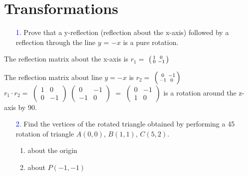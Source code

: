 \documentclass[11pt]{article}  %
\begin{document}
\section{Transformations}
    \begin{enumerate}[leftmargin=*]
        \item[\textcolor{blue}{1.}] Prove that a y-reflection (reflection about the x-axis) followed by a reflection through the line $y$ = $-x$ is a pure rotation.
    \end{enumerate}
    
    \solution
    
    The reflection matrix about the x-axis is $r_1 = $
    $\begin{psmallmatrix}
        1 & 0\\0 & -1
    \end{psmallmatrix}$
    
    The reflection matrix about line $y = -x$ is $r_2 = $
    $\begin{psmallmatrix}
        0 & -1\\-1 & 0
    \end{psmallmatrix}$\\
    
    $r_1 \cdot r_2 = $
    $\begin{pmatrix}
        1 & 0\\0 & -1
    \end{pmatrix}$
    $\begin{pmatrix}
        0 & -1\\-1 & 0
    \end{pmatrix}$
    $=$
    $\begin{pmatrix}
        0 & -1\\1 & 0
    \end{pmatrix}$
    is a rotation around the z-axis by 90\textdegree\hspace{0mm}.\\
    
    \begin{enumerate}[leftmargin=*]
        \item[\textcolor{blue}{2.}] Find the vertices of the rotated triangle obtained by performing a 45\textdegree\hspace{0mm} rotation of triangle $A(0,0)$, $B(1,1)$, $C(5,2)$.
        \begin{enumerate}[leftmargin=6.5mm]
            \item about the origin
            \item about $P(-1,-1)$
        \end{enumerate}
    \end{enumerate}
    
\end{document}
